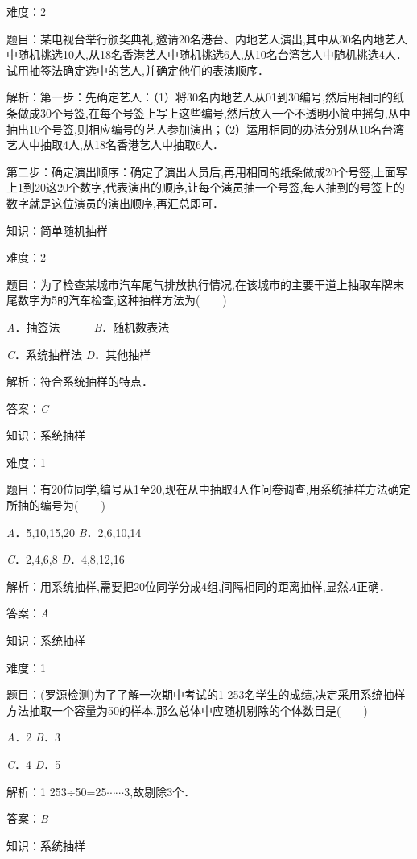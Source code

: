 \documentclass{article} %
\begin{document}
难度：2

题目：某电视台举行颁奖典礼,邀请20名港台、内地艺人演出,其中从30名内地艺人中随机挑选10人,从18名香港艺人中随机挑选6人,从10名台湾艺人中随机挑选4人．试用抽签法确定选中的艺人,并确定他们的表演顺序．

解析：第一步：先确定艺人：（1）将30名内地艺人从01到30编号,然后用相同的纸条做成30个号签,在每个号签上写上这些编号,然后放入一个不透明小筒中摇匀,从中抽出10个号签,则相应编号的艺人参加演出；（2）运用相同的办法分别从10名台湾艺人中抽取4人,从18名香港艺人中抽取6人．

第二步：确定演出顺序：确定了演出人员后,再用相同的纸条做成20个号签,上面写上1到20这20个数字,代表演出的顺序,让每个演员抽一个号签,每人抽到的号签上的数字就是这位演员的演出顺序,再汇总即可．



知识：简单随机抽样

难度：2

题目：为了检查某城市汽车尾气排放执行情况,在该城市的主要干道上抽取车牌末尾数字为5的汽车检查,这种抽样方法为(　　)

\textit{A}．抽签法　　　\textit{B}．随机数表法

\textit{C}．系统抽样法  \textit{D}．其他抽样

解析：符合系统抽样的特点．

答案：\textit{C}

知识：系统抽样

难度：1

题目：有20位同学,编号从1至20,现在从中抽取4人作问卷调查,用系统抽样方法确定所抽的编号为(　　)

\textit{A}．5,10,15,20  \textit{B}．2,6,10,14

\textit{C}．2,4,6,8     \textit{D}．4,8,12,16

解析：用系统抽样,需要把20位同学分成4组,间隔相同的距离抽样,显然\textit{A}正确．

答案：\textit{A}

知识：系统抽样

难度：1

题目：(罗源检测)为了了解一次期中考试的1 253名学生的成绩,决定采用系统抽样方法抽取一个容量为50的样本,那么总体中应随机剔除的个体数目是(　　)

\textit{A}．2  \textit{B}．3

\textit{C}．4  \textit{D}．5

解析：1 253$\mathrm{\div}$50=25$\cdots\cdots$3,故剔除3个．

答案：\textit{B}

知识：系统抽样
\end{document}
